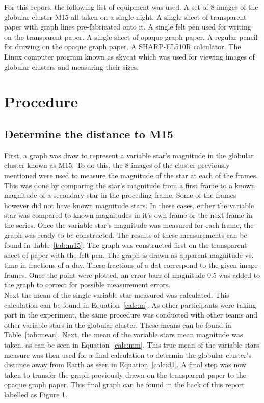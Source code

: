 \documentclass{article}
\begin{document}
For this report, the following list of equipment was used. A set of 8 images of the globular
cluster M15 all taken on a single night. A single sheet of transparent paper with graph lines
pre-fabricated onto it. A single felt pen used for writing on the transparent paper.
A single sheet of opaque graph paper. A regular pencil for drawing on the opaque 
graph paper. A SHARP-EL510R calculator. The Linux computer program
known as skycat which was used for viewing images of globular clusters and measuring their
sizes.


\section{Procedure}

\subsection{Determine the distance to M15}

First, a graph was draw to represent a variable star's magnitude in the globular cluster
known as M15. To do this, the 8 images of the cluster previously mentioned were used to
measure the magnitude of the star at each of the frames. This was done by comparing the
star's magnitude from a first frame to a known magnitude of a secondary star in the proceding
frame. Some of the frames however did not have known magnitude stars. In these cases, either
the variable star was compared to known magnitudes in it's own frame or the next frame in
the series. Once the variable star's magnitude was measured for each frame, the graph
was ready to be constructed. The results of these measurements can be found in
Table~\ref{tab:m15}. The graph was constructed first on the transparent sheet of paper with
the felt pen. The graph is drawn as apparent magnitude vs. time in fractions of a day.
These fractions of a dat correspond to the given image frames. Once the point were plotted,
an error barr of magnitude 0.5 was added to the graph to correct for possible measurement
errors. \\

Next the mean of the single variable star measured was calculated. This calculation
can be found in Equation~\ref{calc:m}. As other participants were taking part in the
experiment, the same procedure was conducted with other teams and other variable stars
in the globular cluster. These means can be found in Table~\ref{tab:mean}. Next, 
the mean of the variable stars mean magnitude was taken, as can be seen in 
Equation~\ref{calc:mm}. This true mean of the variable stars measure was then used
for a final calculation to determin the globular cluster's distance away from Earth
as seen in Equation~\ref{calc:d1}. A final step was now taken to transfer the 
graph previously drawn on the transparent paper to the opaque graph paper. This final
graph can be found in the back of this report labelled as Figure 1.
\end{document}
